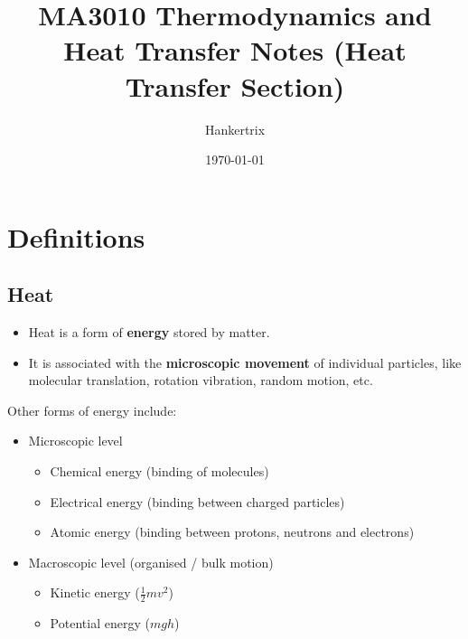 \documentclass[11pt]{article}
\author{Hankertrix}
\date{\today}
\title{MA3010 Thermodynamics and Heat Transfer Notes (Heat Transfer Section)}
\begin{document}
\maketitle
\setcounter{tocdepth}{2}
\tableofcontents \clearpage\section{Definitions}
\label{sec:orgbca8f75}

\subsection{Heat}
\label{sec:orgd46ef95}
\begin{itemize}
\item Heat is a form of \textbf{energy} stored by matter.
\item It is associated with the \textbf{microscopic movement} of individual particles, like molecular translation, rotation vibration, random motion, etc.
\end{itemize}

Other forms of energy include:

\begin{itemize}
\item Microscopic level
\begin{itemize}
\item Chemical energy (binding of molecules)
\item Electrical energy (binding between charged particles)
\item Atomic energy (binding between protons, neutrons and electrons)
\end{itemize}

\item Macroscopic level (organised / bulk motion)
\begin{itemize}
\item Kinetic energy (\(\frac{1}{2} mv^2\))
\item Potential energy (\(mgh\))
\end{itemize}
\end{itemize}
\end{document}
